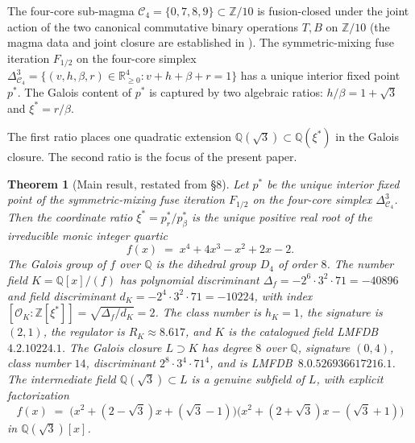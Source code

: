 \documentclass[11pt,reqno]{amsart}
\theoremstyle{plain}
\newtheorem{theorem}{Theorem}[section]
\theoremstyle{definition}
\theoremstyle{remark}
\newcommand{\Q}{\mathbb{Q}}
\newcommand{\Z}{\mathbb{Z}}
\newcommand{\R}{\mathbb{R}}
\newcommand{\Cfour}{\mathcal{C}_{4}}
\newcommand{\TS}{T}
\newcommand{\BH}{B}
\begin{document}
The four-core sub-magma $\Cfour = \{0, 7, 8, 9\} \subset \Z/10$ is
fusion-closed under the joint action of the two canonical commutative
binary operations $\TS, \BH$ on $\Z/10$ (the magma data and joint
closure are established in \cite{SandersGishFourCore}). The
symmetric-mixing fuse iteration $F_{1/2}$ on the four-core simplex
$\Delta^{3}_{\Cfour} = \{(v, h, \beta, r) \in \R_{\geq 0}^{4} :
v + h + \beta + r = 1\}$ has a unique interior fixed point $p^{*}$.
The Galois content of $p^{*}$ is captured by two algebraic ratios:
$h/\beta = 1 + \sqrt{3}$ and $\xi^{*} = r/\beta$.

The first ratio places one quadratic extension $\Q(\sqrt{3}) \subset
\Q(\xi^{*})$ in the Galois closure. The second ratio is the focus of
the present paper.

\begin{theorem}[Main result, restated from \cite{SandersGishFourCore} §8]
\label{thm:galois}
Let $p^{*}$ be the unique interior fixed point of the
symmetric-mixing fuse iteration $F_{1/2}$ on the four-core simplex
$\Delta^{3}_{\Cfour}$. Then the coordinate ratio
$\xi^{*} = p^{*}_{r}/p^{*}_{\beta}$ is the unique positive real root of
the irreducible monic integer quartic
\[
  f(x) \;=\; x^{4} + 4x^{3} - x^{2} + 2x - 2.
\]
The Galois group of $f$ over $\Q$ is the dihedral group $D_{4}$ of
order $8$. The number field $K = \Q[x]/(f)$ has polynomial discriminant
$\Delta_{f} = -2^{6}\cdot 3^{2}\cdot 71 = -40896$ and field
discriminant $d_{K} = -2^{4}\cdot 3^{2}\cdot 71 = -10224$, with index
$[\mathcal{O}_{K} : \Z[\xi^{*}]] = \sqrt{\Delta_{f}/d_{K}} = 2$.
The class number is $h_{K} = 1$, the signature is $(2, 1)$, the
regulator is $R_{K} \approx 8.617$, and $K$ is the catalogued field
LMFDB~$4.2.10224.1$. The Galois closure $L \supset K$
has degree $8$ over $\Q$, signature $(0, 4)$, class number $14$,
discriminant $2^{8}\cdot 3^{4}\cdot 71^{4}$, and is
LMFDB~$8.0.526936617216.1$. The intermediate field $\Q(\sqrt{3}) \subset
L$ is a genuine subfield of $L$, with explicit factorization
\[
  f(x) \;=\; \bigl(x^{2}+(2-\sqrt{3})x+(\sqrt{3}-1)\bigr)
             \bigl(x^{2}+(2+\sqrt{3})x-(\sqrt{3}+1)\bigr)
\]
in $\Q(\sqrt{3})[x]$.
\end{theorem}
\end{document}
